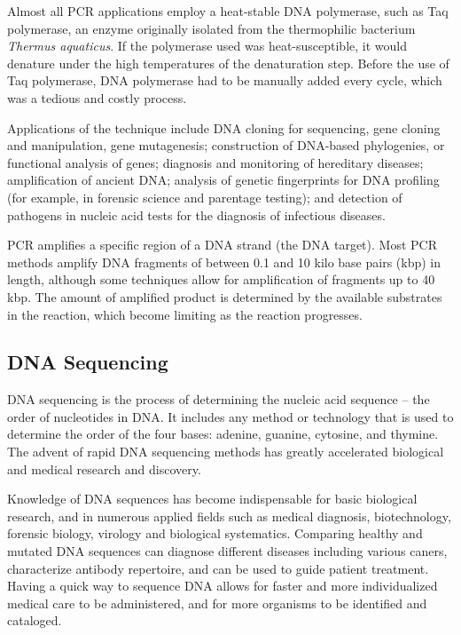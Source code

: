Almost all PCR applications employ a heat-stable DNA polymerase, such as Taq polymerase, an enzyme originally isolated from the thermophilic bacterium \emph{Thermus aquaticus}. If the polymerase used was heat-susceptible, it would denature under the high temperatures of the denaturation step. Before the use of Taq polymerase, DNA polymerase had to be manually added every cycle, which was a tedious and costly process.

Applications of the technique include DNA cloning for sequencing, gene cloning and manipulation, gene mutagenesis; construction of DNA-based phylogenies, or functional analysis of genes; diagnosis and monitoring of hereditary diseases; amplification of ancient DNA; analysis of genetic fingerprints for DNA profiling (for example, in forensic science and parentage testing); and detection of pathogens in nucleic acid tests for the diagnosis of infectious diseases.

PCR amplifies a specific region of a DNA strand (the DNA target). Most PCR methods amplify DNA fragments of between 0.1 and 10 kilo base pairs (kbp) in length, although some techniques allow for amplification of fragments up to 40 kbp. The amount of amplified product is determined by the available substrates in the reaction, which become limiting as the reaction progresses.

\hypertarget{dna-sequencing}{%
\subsection{DNA Sequencing}\label{dna-sequencing}}

DNA sequencing is the process of determining the nucleic acid sequence -- the order of nucleotides in DNA. It includes any method or technology that is used to determine the order of the four bases: adenine, guanine, cytosine, and thymine. The advent of rapid DNA sequencing methods has greatly accelerated biological and medical research and discovery.

Knowledge of DNA sequences has become indispensable for basic biological research, and in numerous applied fields such as medical diagnosis, biotechnology, forensic biology, virology and biological systematics. Comparing healthy and mutated DNA sequences can diagnose different diseases including various caners, characterize antibody repertoire, and can be used to guide patient treatment. Having a quick way to sequence DNA allows for faster and more individualized medical care to be administered, and for more organisms to be identified and cataloged.

